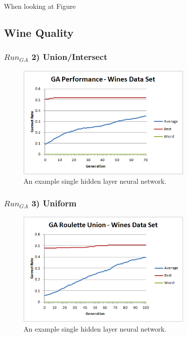 \documentclass[journal]{IEEEtran}
\begin{document}
    When looking at Figure

  \subsection{Wine Quality}
    \subsubsection*{$Run_{GA}$ 2) Union/Intersect}
      \begin{figure}[here]%
        \centering
        \includegraphics[width=3.4in]{wine_performance_new}
        \caption{An example single hidden layer neural network.}
        \label{fig:wine_performace_new}
      \end{figure}

    \subsubsection*{$Run_{GA}$ 3) Uniform}
      \begin{figure}[here]%
        \centering
        \includegraphics[width=3.4in]{wine_uniform}
        \caption{An example single hidden layer neural network.}
        \label{fig:wine_uniform}
      \end{figure}
\end{document}
